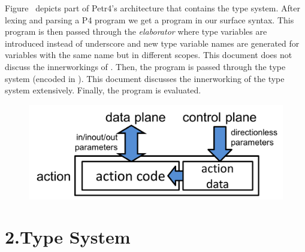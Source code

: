 \documentclass[11pt]{article}
\begin{document}
{%
\noindent{}Figure~ depicts part of Petr4's architecture that contains the type system.
After lexing and parsing a P4 program we get a program in our surface syntax. This
program is then passed through the \emph{elaborator} where type variables are introduced
instead of underscore and new type variable names are generated for variables with the
same name but in different scopes. This document does not discuss the innerworkings of
. Then, the program is passed through the type system (encoded in ).
This document discusses the innerworking of the type system extensively. Finally, the
program is evaluated.%

\begin{figure}[tbp]%
\begin{mdcenter}%

\noindent{}\includegraphics[keepaspectratio=true,width=\dimwidth{1.00}]{figs/petr4/arch}{}%

\mdhr{}%

\noindent{}%
\end{mdcenter}%
\end{figure}%

\section{2.\hspace*{0.5em}Type System}%

}
\end{document}
